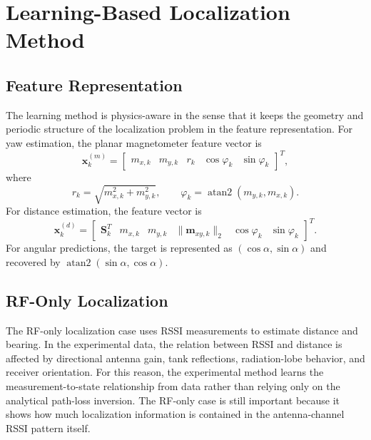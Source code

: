 \documentclass{uhcoethesis}
\begin{document}
\section{Learning-Based Localization Method}

\subsection{Feature Representation}

The learning method is physics-aware in the sense that it keeps the geometry and periodic structure of the localization problem in the feature representation. For yaw estimation, the planar magnetometer feature vector is
\begin{equation}
    \mathbf{x}^{(m)}_k =
    \begin{bmatrix}
    m_{x,k} & m_{y,k} & r_k & \cos\varphi_k & \sin\varphi_k
    \end{bmatrix}^{T},
    \label{eq:ch5_mag_features}
\end{equation}
where
\begin{equation}
    r_k=\sqrt{m_{x,k}^2+m_{y,k}^2}, \qquad
    \varphi_k=\operatorname{atan2}(m_{y,k},m_{x,k}).
    \label{eq:ch5_mag_radius_heading}
\end{equation}
For distance estimation, the feature vector is
\begin{equation}
    \mathbf{x}^{(d)}_k =
    \begin{bmatrix}
    \mathbf{S}_k^{T} & m_{x,k} & m_{y,k} & \|\mathbf{m}_{xy,k}\|_2 & \cos\varphi_k & \sin\varphi_k
    \end{bmatrix}^{T}.
    \label{eq:ch5_distance_features}
\end{equation}
For angular predictions, the target is represented as $(\cos\alpha,\sin\alpha)$ and recovered by $\operatorname{atan2}(\sin\alpha,\cos\alpha)$.

\subsection{RF-Only Localization}

The RF-only localization case uses RSSI measurements to estimate distance and bearing. In the experimental data, the relation between RSSI and distance is affected by directional antenna gain, tank reflections, radiation-lobe behavior, and receiver orientation. For this reason, the experimental method learns the measurement-to-state relationship from data rather than relying only on the analytical path-loss inversion. The RF-only case is still important because it shows how much localization information is contained in the antenna-channel RSSI pattern itself.
\end{document}
